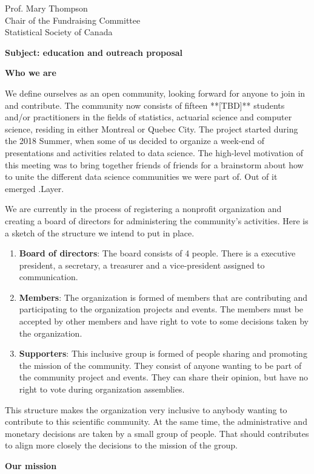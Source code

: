 \documentclass[11pt, a4paper]{letter} %
\begin{document}
\begin{letter}{
	Prof. Mary Thompson\\
	Chair of the Fundraising Committee\\
	Statistical Society of Canada
	
	\bigskip
	\textbf{Subject: education and outreach proposal}%
}
\bigskip
\noindent \textbf{Who we are}

We define ourselves as an open community, looking forward for anyone to join in and contribute. The community now consists of fifteen **[TBD]** students and/or practitioners in the fields of statistics, actuarial science and computer science, residing in either Montreal or Quebec City. The project started during the 2018 Summer, when some of us decided to organize a week-end of presentations and activities related to data science. The high-level motivation of this meeting was to bring together friends of friends for a brainstorm about how to unite the different data science communities we were part of. Out of it emerged .Layer.

We are currently in the process of registering a nonprofit organization and creating a board of directors for administering the community's activities. Here is a sketch of the structure we intend to put in place.

\begin{enumerate}
	\item \textbf{Board of directors}: The board consists of 4 people. There is a executive president, a secretary, a treasurer and a vice-president assigned to communication.
	\item \textbf{Members}: The organization is formed of members that are contributing and participating to the organization projects and events. The members must be accepted by other members and have right to vote to some decisions taken by the organization.
	\item \textbf{Supporters}: This inclusive group is formed of people sharing and promoting the mission of the community. They consist of anyone wanting to be part of the community project and events. They can share their opinion, but have no right to vote during organization assemblies.
\end{enumerate}

This structure makes the organization very inclusive to anybody wanting to contribute to this scientific community. At the same time, the administrative and monetary decisions are taken by a small group of people. That should contributes to align more closely the decisions to the mission of the group.

\bigskip
\noindent \textbf{Our mission}


\end{letter}
\end{document}
